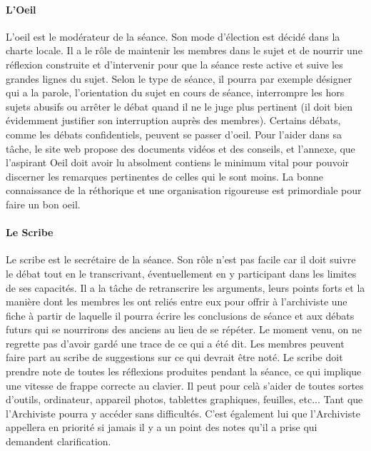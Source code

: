 \documentclass[a4paper,12pt]{article}
\begin{document}
\paragraph{L'Oeil}
L'oeil est le modérateur de la séance. Son mode d'élection est décidé dans la charte locale. Il a le rôle de maintenir les membres dans le sujet et de nourrir une réflexion construite et d'intervenir pour que la séance reste active et suive les grandes lignes du sujet. Selon le type de séance, il pourra par exemple désigner qui a la parole, l'orientation du sujet en cours de séance, interrompre les hors sujets abusifs ou arrêter le débat quand il ne le juge plus pertinent (il doit bien évidemment justifier son interruption auprès des membres). Certains débats, comme les débats confidentiels, peuvent se passer d'oeil. Pour l'aider dans sa tâche, le site web propose des documents vidéos et des conseils, et l'annexe, que l'aspirant Oeil doit avoir lu absolment contiens le minimum vital pour pouvoir discerner les remarques pertinentes de celles qui le sont moins. La bonne connaissance de la réthorique et une organisation rigoureuse est primordiale pour faire un bon oeil. 

\paragraph{Le Scribe}
Le scribe est le secrétaire de la séance. Son rôle n'est pas facile car il doit suivre le débat tout en le transcrivant, éventuellement en y participant dans les limites de ses capacités. Il a la tâche de retranscrire les arguments, leurs points forts et la manière dont les membres les ont reliés entre eux pour offrir à l'archiviste une fiche à partir de laquelle il pourra écrire les conclusions de séance et aux débats futurs qui se nourrirons des anciens au lieu de se répéter. Le moment venu, on ne regrette pas d'avoir gardé une trace de ce qui a été dit. Les membres peuvent faire part au scribe de suggestions sur ce qui devrait être noté. Le scribe doit prendre note de toutes les réflexions produites pendant la séance, ce qui implique une vitesse de frappe correcte au clavier. Il peut pour celà s'aider de toutes sortes d'outils, ordinateur, appareil photos, tablettes graphiques, feuilles, etc... Tant que l'Archiviste pourra y accéder sans difficultés. C'est également lui que l'Archiviste appellera en priorité si jamais il y a un point des notes qu'il a prise qui demandent clarification.
\end{document}

